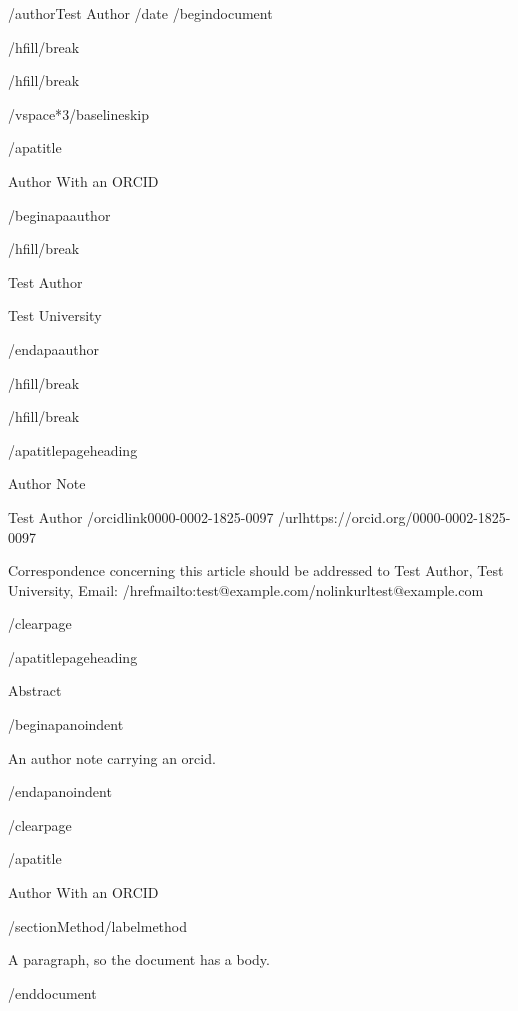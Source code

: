 /author{Test Author}
/date{}
/begin{document}


/hfill/break

/hfill/break

/vspace*{3/baselineskip}

/apatitle{

Author With an ORCID

}

/begin{apaauthor}

/hfill/break

Test Author

Test University

/end{apaauthor}

/hfill/break

/hfill/break

/apatitlepageheading{

Author Note

}

Test Author /orcidlink{0000-0002-1825-0097}
/url{https://orcid.org/0000-0002-1825-0097}

Correspondence concerning this article should be addressed to Test
Author, Test University, Email:
/href{mailto:test@example.com}{/nolinkurl{test@example.com}}

/clearpage

/apatitlepageheading{

Abstract

}

/begin{apanoindent}

An author note carrying an orcid.

/end{apanoindent}

/clearpage

/apatitle{

Author With an ORCID

}

/section{Method}/label{method}

A paragraph, so the document has a body.




/end{document}
